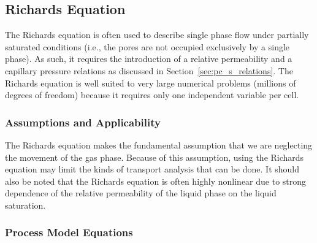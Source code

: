 
\subsection{Richards Equation}
\label{sec:richards-equation}

The Richards equation is often used to describe single phase flow under partially 
saturated conditions (i.e., the pores are not occupied exclusively by a single phase).  
As such, it requires the introduction of a relative permeability and a capillary 
pressure relations as discussed in Section~\ref{sec:pc_s_relations}.
The Richards equation is well suited to very large numerical problems (millions of 
degrees of freedom) because it requires only one independent variable per cell.


\subsubsection{Assumptions and Applicability}

The Richards equation makes the fundamental assumption that we are neglecting
the movement of the gas phase.
Because of this assumption, using the Richards equation may limit the kinds of 
transport analysis that can be done.
It should also be noted that the Richards equation is often highly nonlinear
due to strong dependence of the relative permeability of the liquid phase
on the liquid saturation.


\subsubsection{Process Model Equations} 
\label{sec:richards-model-equations}

